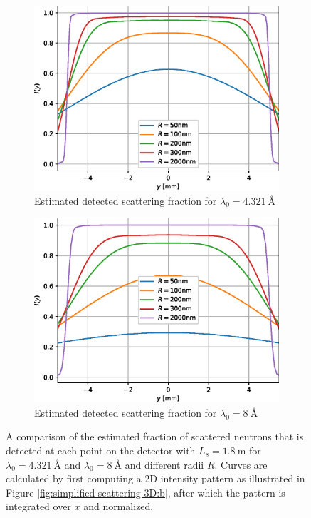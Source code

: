 \begin{figure}[htbp]
	\centering
	\begin{subfigure}[b]{0.49\textwidth}
		\centering
		\includegraphics[width=\textwidth]{simplified-I-scattering-4.321}
		\caption{Estimated detected scattering fraction for $\lambda_0 = \SI{4.321}{\angstrom}$}
		\label{fig:simplified-scattering-4.321}
	\end{subfigure}
	\hfill
	\begin{subfigure}[b]{0.49\textwidth}
		\centering
		\includegraphics[width=\textwidth]{simplified-I-scattering-8.0}
		\caption{Estimated detected scattering fraction for $\lambda_0 = \SI{8}{\angstrom}$}
		\label{fig:simplified-scattering-8}
	\end{subfigure}
	\caption{A comparison of the estimated fraction of scattered neutrons that is detected at each point on the detector with $L_s = \SI{1.8}{\meter}$ for $\lambda_0 = \SI{4.321}{\angstrom}$ and $\lambda_0 = \SI{8}{\angstrom}$ and different radii $R$. Curves are calculated by first computing a 2D intensity pattern as illustrated in Figure \ref{fig:simplified-scattering-3D:b}, after which the pattern is integrated over $x$ and normalized.} 
	\label{fig:simplified-scattering}
\end{figure}
